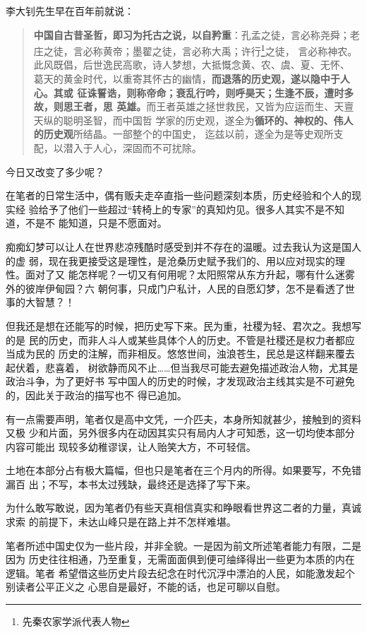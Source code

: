 李大钊先生早在百年前就说：
\begin{quotation}
  \textbf{中国自古昔圣哲，即习为托古之说，以自矜重}：孔孟之徒，言必称尧舜；老
  庄之徒，言必称黄帝；墨翟之徒，言必称大禹；许行\footnote{先秦农家学派代表人物}之徒，
  言必称神农。此风既倡，后世逸民高歌，诗人梦想，大抵慨念黄、农、虞、夏、无怀、
  葛天的黄金时代，以重寄其怀古的幽情，\textbf{而退落的历史观，遂以隐中于人心。其或
    征诛誓诰，则称帝命；衰乱行吟，则呼昊天；生逢不辰，遭时多故，则思王者，思
    英雄。}而王者英雄之拯世救民，又皆为应运而生、天亶天纵的聪明圣智，而中国哲
  学家的历史观，遂全为\textbf{循环的、神权的、伟人的历史观}所结晶。一部整个的中国史，
  迄兹以前，遂全为是等史观所支配，以潜入于人心，深固而不可扰除。
\end{quotation}

今日又改变了多少呢？

在笔者的日常生活中，偶有贩夫走卒直指一些问题深刻本质，历史经验和个人的现实经
验给予了他们一些超过“转椅上的专家”的真知灼见。很多人其实不是不知道，不是不
能知道，只是不愿面对。

痴痴幻梦可以让人在世界悲凉残酷时感受到并不存在的温暖。过去我认为这是国人的虚
弱，现在我更接受这是理性，是沧桑历史赋予我们的、用以应对现实的理性。面对了又
能怎样呢？一切又有何用呢？太阳照常从东方升起，哪有什么迷雾外的彼岸伊甸园？六
朝何事，只成门户私计，人民的自愿幻梦，怎不是看透了世事的大智慧？！

但我还是想在还能写的时候，把历史写下来。民为重，社稷为轻、君次之。我想写的是
民的历史，而非人斗人或某些具体个人的历史。不管是社稷还是权力者都应当成为民的
历史的注解，而非相反。悠悠世间，浊浪苍生，民总是这样翻来覆去起伏着，悲喜着，
树欲静而风不止……但当我尽可能去避免描述政治人物，尤其是政治斗争，为了更好书
写中国人的历史的时候，才发现政治主线其实是不可避免的，因此关于政治的描写也不
得已追加。


有一点需要声明，笔者仅是高中文凭，一介匹夫，本身所知就甚少，接触到的资料又极
少和片面，另外很多内在动因其实只有局内人才可知悉，这一切均使本部分内容可能出
现较多幼稚谬误，让人贻笑大方，不可轻信。

土地在本部分占有极大篇幅，但也只是笔者在三个月内的所得。如果要写，不免错漏百
出；不写，本书太过残缺，最终还是选择了写下来。

为什么敢写敢说，因为笔者仍有些天真相信真实和睁眼看世界这二者的力量，真诚求索
的前提下，未达山峰只是在路上并不怎样难堪。

笔者所述中国史仅为一些片段，并非全貌。一是因为前文所述笔者能力有限，二是因为
历史往往相通，乃至重复，无需面面俱到便可䌷绎得出一些更为本质的内在逻辑。笔者
希望借这些历史片段去纪念在时代沉浮中漂泊的人民，如能激发起个别读者公平正义之
心思自是最好，不能的话，也足可聊以自慰。

